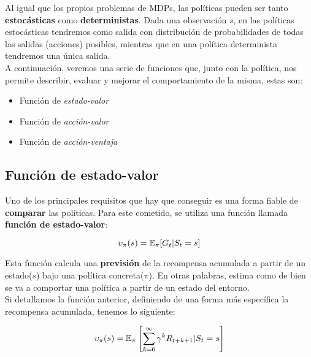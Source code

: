 \documentclass[11pt,fleqn]{book} %
\begin{document}
Al igual que los propios problemas de MDPs, las políticas pueden ser tanto \textbf{estocásticas} como \textbf{deterministas}. Dada una observación $s$, en las políticas estocásticas tendremos como salida con distribución de probabilidades de todas las salidas (acciones) posibles, mientras que en una política determinista tendremos una única salida. \\

A continuación, veremos una serie de funciones que, junto con la política, nos permite describir, evaluar y mejorar el comportamiento de la misma, estas son:\\

\begin{itemize}
	\item Función de \textit{estado-valor}\\
	
	\item Función de \textit{acción-valor}\\
	
	\item Función de \textit{acción-ventaja}\\
\end{itemize}

\subsection{Función de estado-valor}

Uno de los principales requisitos que hay que conseguir es una forma fiable de \textbf{comparar} las políticas. Para este cometido, se utiliza una función llamada \textbf{función de estado-valor}: 

\begin{equation}
\upsilon_\pi(s)=\mathbb{E}_\pi[G_t|S_t=s]
\end{equation}

Esta función calcula una \textbf{previsión} de la recompensa acumulada a partir de un estado($s$) bajo una política concreta($\pi$). En otras palabras, estima como de bien se va a comportar una política a partir de un estado del entorno.\\

Si detallamos la función anterior, definiendo de una forma más específica la recompensa acumulada, tenemos lo siguiente:

\begin{equation}
\upsilon_\pi(s)=\mathbb{E}_\pi\left[\sum^\infty_{k=0}\gamma^kR_{t+k+1} | S_t=s\right]
\end{equation}
\end{document}
